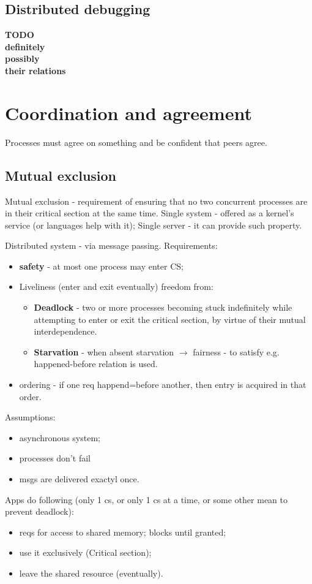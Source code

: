 \documentclass[10pt,a4paper]{article}
\begin{document}
\subsection{Distributed debugging}
\textbf{TODO}\\
\textbf{definitely}\\
\textbf{possibly}\\
\textbf{their relations}

\section{Coordination and agreement}
Processes must agree on something and be confident that peers agree. 

\subsection{Mutual exclusion}
Mutual exclusion - requirement of ensuring that no two concurrent processes are in their critical section at the same time. Single system - offered as a kernel's service (or languages help with it); Single server - it can provide such property. 

Distributed system - via message passing. 
Requirements:
\begin{itemize}
	\item \textbf{safety} - at most one process may enter CS;

	\item Liveliness (enter and exit eventually) freedom from:
		\begin{itemize}
			\item \textbf{Deadlock} - two or more processes becoming stuck indefinitely while attempting to enter or exit the critical section, by virtue of their mutual interdependence.
			\item\textbf{Starvation} - when absent starvation $\rightarrow$ fairness - to satisfy e.g. happened-before relation is used.
		\end{itemize}
	\item ordering - if one req happend=before another, then entry is acquired in that order.
\end{itemize}

Assumptions:
\begin{itemize}
	\item asynchronous system;
	\item processes don't fail
	\item msgs are delivered exactyl once.
\end{itemize}
Apps do following (only 1 cs, or only 1 cs at a time, or some other mean to prevent deadlock):
\begin{itemize}
	\item reqs for access to shared memory; blocks until granted;
	\item use it exclusively (Critical section);
	\item leave the shared resource (eventually).
\end{itemize}
\end{document}
